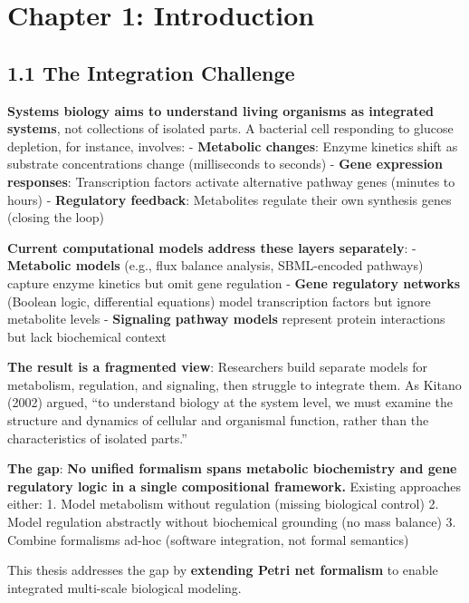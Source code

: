 \hypertarget{chapter-1-introduction}{%
\chapter{Chapter 1: Introduction}\label{chapter-1-introduction}}

\hypertarget{the-integration-challenge}{%
\section{1.1 The Integration
Challenge}\label{the-integration-challenge}}

\textbf{Systems biology aims to understand living organisms as
integrated systems}, not collections of isolated parts. A bacterial cell
responding to glucose depletion, for instance, involves: -
\textbf{Metabolic changes}: Enzyme kinetics shift as substrate
concentrations change (milliseconds to seconds) - \textbf{Gene
expression responses}: Transcription factors activate alternative
pathway genes (minutes to hours) - \textbf{Regulatory feedback}:
Metabolites regulate their own synthesis genes (closing the loop)

\textbf{Current computational models address these layers separately}: -
\textbf{Metabolic models} (e.g., flux balance analysis, SBML-encoded
pathways) capture enzyme kinetics but omit gene regulation -
\textbf{Gene regulatory networks} (Boolean logic, differential
equations) model transcription factors but ignore metabolite levels -
\textbf{Signaling pathway models} represent protein interactions but
lack biochemical context

\textbf{The result is a fragmented view}: Researchers build separate
models for metabolism, regulation, and signaling, then struggle to
integrate them. As Kitano (2002) argued, ``to understand biology at the
system level, we must examine the structure and dynamics of cellular and
organismal function, rather than the characteristics of isolated
parts.''

\textbf{The gap}: \textbf{No unified formalism spans metabolic
biochemistry and gene regulatory logic in a single compositional
framework.} Existing approaches either: 1. Model metabolism without
regulation (missing biological control) 2. Model regulation abstractly
without biochemical grounding (no mass balance) 3. Combine formalisms
ad-hoc (software integration, not formal semantics)

This thesis addresses the gap by \textbf{extending Petri net formalism}
to enable integrated multi-scale biological modeling.

